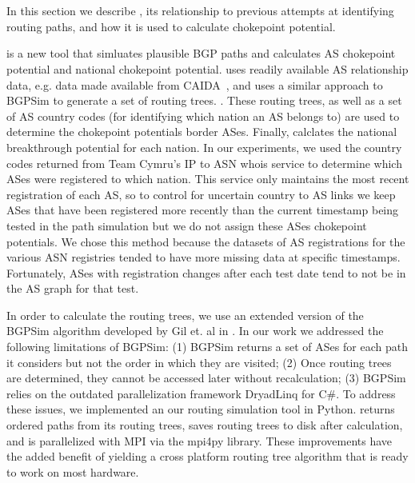 
\section{\toolname}

In this section we describe \toolname{}, its relationship to previous attempts
at identifying routing paths, and how it is used to calculate chokepoint
potential.

\toolname{} is a new tool that simluates plausible BGP paths and calculates AS
chokepoint potential and national chokepoint potential.  \toolname{} uses
readily available AS relationship data, e.g. data made available from
CAIDA~\cite{CAIDA}, and uses a similar approach to BGPSim \cite{quicksand} to
generate a set of routing trees. . These routing trees, as well as a set of AS
country codes (for identifying which nation an AS belongs to) are used to
determine the chokepoint potentials border ASes.  Finally, \toolname{}
calclates the national breakthrough potential for each nation. In our
experiments, we used the country codes returned from Team Cymru's IP to ASN
whois service \cite{cymru} to determine which ASes were registered to which
nation.  This service only maintains the most recent registration of each AS,
so to control for uncertain country to AS links we keep ASes that have been
registered more recently than the current timestamp being tested in the path
simulation but we do not assign these ASes chokepoint
potentials. We chose this
method because the datasets of AS registrations for the various ASN registries
tended to have more missing data at specific timestamps.  Fortunately, ASes
with registration changes after each test date tend to not be in the AS graph
for that test. 

\par In order to calculate the routing trees, we use an extended version of the
BGPSim algorithm developed by Gil et. al in \cite{quicksand}. In our work we
addressed the following limitations of BGPSim: (1) BGPSim returns a set of ASes
for each path it considers but not the order in which they are visited; (2)
Once routing trees are determined, they cannot be accessed later without
recalculation; (3) BGPSim relies on the outdated parallelization framework
DryadLinq for C\#. To address these issues, we implemented an our routing
simulation tool in Python. \toolname{} returns ordered paths from its routing trees, saves
routing trees to disk after calculation, and is parallelized with MPI via the
mpi4py library. These improvements have the added benefit of yielding a cross
platform routing tree algorithm that is ready to work on most hardware.

